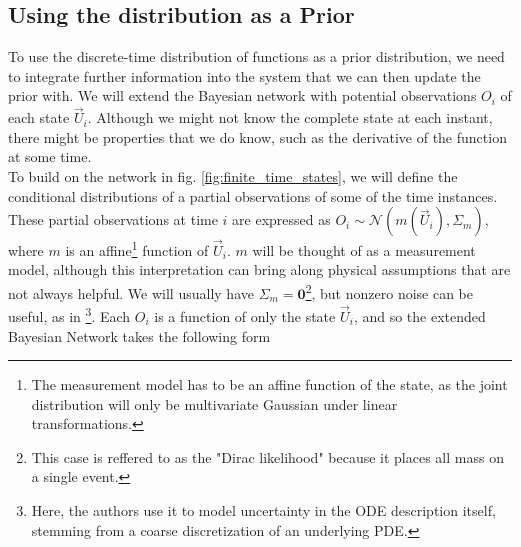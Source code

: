 \subsection*{Using the distribution as a Prior}
To use the discrete-time distribution of functions as a prior distribution, we need to integrate further information into the system that we can then update the prior with. We will extend the Bayesian network with potential observations $O_i$ of each state $\vec{U}_i$. Although we might not know the complete state at each instant, there might be properties that we do know, such as the derivative of the function at some time. 
\\ To build on the network in fig. \ref{fig:finite_time_states}, we will define the conditional distributions of a partial observations of some of the time instances. These partial observations at time $i$ are expressed as $O_i \sim \mathcal{N}(m(\vec{U}_i), \Sigma_m)$, where $m$ is an affine\footnote{The measurement model has to be an affine function of the state, as the joint distribution will only be multivariate Gaussian under linear transformations.} function of $\vec{U}_i$. $m$ will be thought of as a measurement model, although this interpretation can bring along physical assumptions that are not always helpful. We will usually have $\Sigma_m = \mathbf{0}$\footnote{This case is reffered to as the "Dirac likelihood" \cite{exponential_probabilistic} because it places all mass on a single event.}, but nonzero noise can be useful, as in \cite{pnmol}\footnote{Here, the authors use it to model uncertainty in the ODE description itself, stemming from a coarse discretization of an underlying PDE.}.
Each $O_i$ is a function of only the state $\vec{U}_i$, and so the extended Bayesian Network takes the following form
